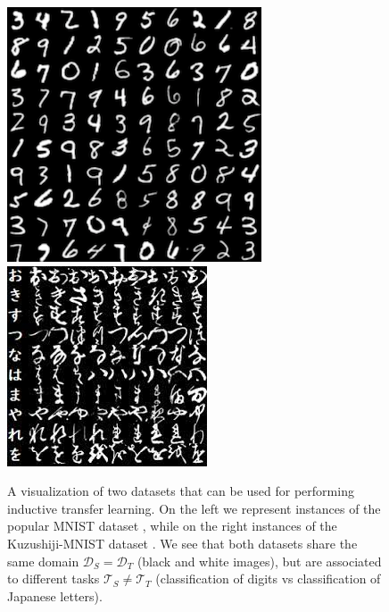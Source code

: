 \begin{figure}
    \includegraphics[width=\linewidth]{./Images/Chapter03/mnist_dataset.png}
  \endminipage\hfill
    \includegraphics[width=\linewidth]{./Images/Chapter03/kuzushiji_mnist.jpg}
  \endminipage\hfill
  \caption{A visualization of two datasets that can be used for performing inductive transfer learning. On the left we represent instances of the popular MNIST dataset \cite{lecun1994mnist}, while on the right instances of the Kuzushiji-MNIST dataset \cite{clanuwat2018deep}. We see that both datasets share the same domain $\mathcal{D}_S = \mathcal{D}_T$ (black and white images), but are associated to different tasks $\mathcal{T}_S \neq \mathcal{T}_T$ (classification of digits vs classification of Japanese letters).}
  \label{fig:inductive_tl}
\end{figure}



